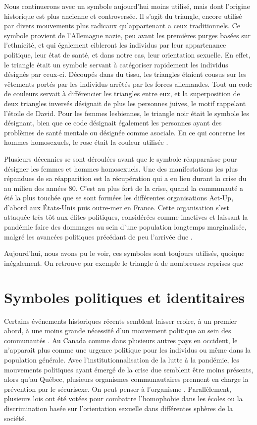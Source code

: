 Nous continuerons avec un symbole aujourd'hui moins utilisé, mais dont l'origine historique est plus ancienne et controversée.
Il s'agit du triangle, encore utilisé par divers mouvements plus radicaux qu'appartenant a ceux traditionnels.
Ce symbole provient de l'Allemagne nazie, peu avant les premières purges basées sur l'ethnicité, et qui également cibleront les individus par leur appartenance politique, leur état de santé, et dans notre cas, leur orientation sexuelle.
En effet, le triangle était un symbole servant à catégoriser rapidement les individus désignés par ceux-ci.
Découpés dans du tissu, les triangles étaient cousus sur les vêtements portés par les individus arrêtés par les forces allemandes.
Tout un code de couleurs servait à différencier les triangles entre eux, et la superposition de deux triangles inversés désignait de plus les personnes juives, le motif rappelant l'étoile de David.
Pour les femmes lesbiennes, le triangle noir était le symbole les désignant, bien que ce code désignait également les personnes ayant des problèmes de santé mentale ou désignée comme asociale.
En ce qui concerne les hommes homosexuels, le rose était la couleur utilisée \missref{}.

Plusieurs décennies se sont déroulées avant que le symbole réapparaisse pour désigner les femmes et hommes homosexuels.
Une des manifestations les plus répandues de sa réapparition est la récupération qui a eu lieu durant la crise du \vih{} au milieu des années 80.
C'est au plus fort de la crise, quand la communauté \lgbt{} a été la plus touchée que se sont formées les différentes organisations Act-Up, d'abord aux États-Unis puis outre-mer en France.
Cette organisation s'est attaquée très tôt aux élites politiques, considérées comme inactives et laissant la pandémie faire des dommages au sein d'une population longtemps marginalisée, malgré les avancées politiques précédant de peu l'arrivée due \vih{}.

Aujourd'hui, nous avons pu le voir, ces symboles sont toujours utilisés, quoique inégalement.
On retrouve par exemple le triangle à de nombreuses reprises que

\section{Symboles politiques et identitaires}
\label{sec:symboles_politiques_et_identitaire}
Certains événements historiques récents semblent laisser croire, à un premier abord, à une moins grande nécessité d'un mouvement politique au sein des communautés \lgbt{}.
Au Canada comme dans plusieurs autres pays en occident, le \sida{} n'apparait plus comme une urgence politique pour les individus \lgbt{} ou même dans la population générale.
Avec l'institutionnalisation de la lutte à la pandémie, les mouvements politiques ayant  émergé de la crise due \vih{} semblent être moins présents, alors qu'au Québec, plusieurs organismes communautaires prennent en charge la prévention par le sécurisexe.
On peut penser à l'organisme \miels{}.
Parallèlement, plusieurs lois ont été votées pour combattre l'homophobie dans les écoles ou la discrimination basée sur l'orientation sexuelle dans différentes sphères de la société.

